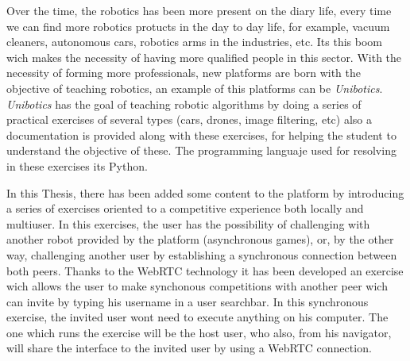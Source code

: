 \documentclass[a4paper, 12pt]{book}
\begin{document}
Over the time, the robotics has been more present on the diary life, every time we can find more robotics protucts in the day to day life, for example, vacuum cleaners, autonomous cars, robotics arms in the industries, etc. Its this boom wich makes the necessity of having more qualified people in this sector. With the necessity of forming more professionals, new platforms are born with the objective of teaching robotics, an example of this platforms can be \emph{Unibotics}. \emph{Unibotics} has the goal of teaching robotic algorithms by doing a series of practical exercises of several types (cars, drones, image filtering, etc) also a documentation is provided along with these exercises, for helping the student to understand the objective of these. The programming languaje used for resolving in these exercises its Python.

In this Thesis, there has been added some content to the platform by introducing a series of exercises oriented to a competitive experience both locally and multiuser. In this exercises, the user has the possibility of challenging with another robot provided by the platform (asynchronous games), or, by the other way, challenging another user by establishing a synchronous connection between both peers. Thanks to the WebRTC technology it has been developed an exercise wich allows the user to make synchonous competitions with another peer wich can invite by typing his username in a user searchbar. In this synchronous exercise, the invited user wont need to execute anything on his computer. The one which runs the exercise will be the host user, who also, from his navigator, will share the interface to the invited user by using a  WebRTC connection.



\tableofcontents 
\cleardoublepage
\listoffigures %
\end{document}
